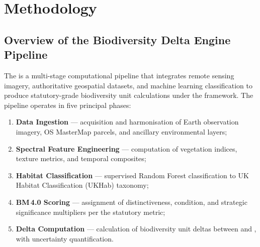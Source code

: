 \chapter{Methodology}
\label{ch:methodology}

\section{Overview of the Biodiversity Delta Engine Pipeline}

The \BDE{} is a multi-stage computational pipeline that integrates remote sensing imagery, authoritative geospatial datasets, and machine learning classification to produce statutory-grade biodiversity unit calculations under the \BM{} framework. The pipeline operates in five principal phases:

\begin{enumerate}
  \item \textbf{Data Ingestion} — acquisition and harmonisation of Earth observation imagery, OS MasterMap parcels, and ancillary environmental layers;
  \item \textbf{Spectral Feature Engineering} — computation of vegetation indices, texture metrics, and temporal composites;
  \item \textbf{Habitat Classification} — supervised Random Forest classification to UK Habitat Classification (UKHab) taxonomy;
  \item \textbf{BM\,4.0 Scoring} — assignment of distinctiveness, condition, and strategic significance multipliers per the statutory metric;
  \item \textbf{Delta Computation} — calculation of biodiversity unit deltas between \Tzero{} and \Tone, with uncertainty quantification.
\end{enumerate}


